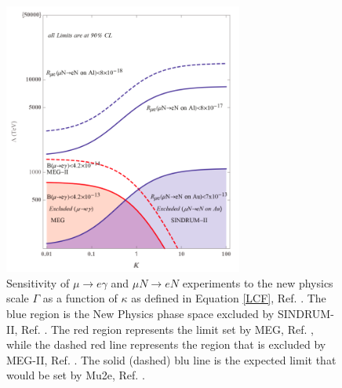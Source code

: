 \begin{figure}[!h]
\centering
\includegraphics[width =0.7\textwidth]{figures/png/Screenshot_20240313_120457.png}
\caption[Sensitivity of $\mu \rightarrow e\gamma$ and $\mu N \rightarrow eN$ experiments.]{Sensitivity of $\mu \rightarrow e\gamma$ and $\mu N \rightarrow eN$ experiments to the new physics
scale $\Gamma$ as a function of $\kappa$ as defined in Equation \ref{LCF}, Ref. \cite{CGroup:2022tli}. The blue region is the New
Physics phase space excluded by SINDRUM-II, Ref. \cite{SINDRUMII:2006dvw}. The red region represents the
limit set by MEG, Ref. \cite{megi}, while the dashed red line represents the region that is
excluded by MEG-II, Ref. \cite{megiicollaboration2024search}. The solid (dashed) blu line is the
expected limit that would be set by Mu2e, Ref. \cite{universe9010054}.}
\label{fig:muchannelbr}
\end{figure}
